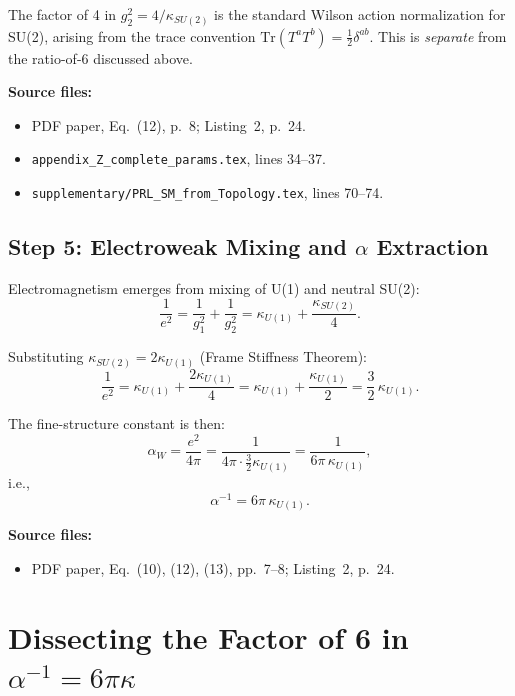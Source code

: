 \documentclass[11pt]{article}
\begin{document}
The factor of 4 in $g_2^2 = 4/\kappa_{SU(2)}$ is the standard Wilson
action normalization for SU(2), arising from the trace convention
$\mathrm{Tr}(T^a T^b) = \tfrac{1}{2}\delta^{ab}$.
This is \emph{separate} from the ratio-of-6 discussed above.

\textbf{Source files:}
\begin{itemize}
\item PDF paper, Eq.~(12), p.~8; Listing~2, p.~24.
\item \texttt{appendix\_Z\_complete\_params.tex}, lines 34--37.
\item \texttt{supplementary/PRL\_SM\_from\_Topology.tex}, lines 70--74.
\end{itemize}


\subsection{Step 5: Electroweak Mixing and $\alpha$ Extraction}

Electromagnetism emerges from mixing of U(1) and neutral SU(2):
\begin{equation}\label{eq:em-mixing}
\frac{1}{e^2} = \frac{1}{g_1^2} + \frac{1}{g_2^2}
= \kappa_{U(1)} + \frac{\kappa_{SU(2)}}{4}.
\end{equation}

Substituting $\kappa_{SU(2)} = 2\kappa_{U(1)}$ (Frame Stiffness Theorem):
\begin{equation}
\frac{1}{e^2} = \kappa_{U(1)} + \frac{2\kappa_{U(1)}}{4}
= \kappa_{U(1)} + \frac{\kappa_{U(1)}}{2}
= \frac{3}{2}\,\kappa_{U(1)}.
\end{equation}

The fine-structure constant is then:
\begin{equation}\label{eq:alpha-from-kappa}
\alpha_W = \frac{e^2}{4\pi}
= \frac{1}{4\pi \cdot \frac{3}{2}\kappa_{U(1)}}
= \frac{1}{6\pi\,\kappa_{U(1)}},
\end{equation}
i.e.,
\begin{equation}\label{eq:alpha-inverse}
\boxed{\alpha^{-1} = 6\pi\,\kappa_{U(1)}.}
\end{equation}

\textbf{Source files:}
\begin{itemize}
\item PDF paper, Eq.~(10), (12), (13), pp.~7--8; Listing~2, p.~24.
\end{itemize}


\section{Dissecting the Factor of 6 in $\alpha^{-1} = 6\pi\kappa$}
\end{document}
